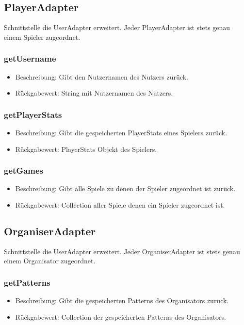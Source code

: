\documentclass[a4paper]{scrreprt}
\begin{document}
	\subsection{PlayerAdapter}
	Schnittstelle die UserAdapter erweitert.
	Jeder PlayerAdapter ist stets genau einem Spieler zugeordnet.

	\subsubsection{getUsername}
	\begin{itemize}
		\item Beschreibung: Gibt den Nutzernamen des Nutzers zurück.
		\item Rückgabewert: String mit Nutzernamen des Nutzers.
	\end{itemize}

	\subsubsection{getPlayerStats}
	\begin{itemize}
		\item Beschreibung: Gibt die gespeicherten PlayerStats eines Spielers zurück.
		\item Rückgabewert: PlayerStats Objekt des Spielers.
	\end{itemize}

	\subsubsection{getGames}
	\begin{itemize}
		\item Beschreibung: Gibt alle Spiele zu denen der Spieler zugeordnet ist zurück.
		\item Rückgabewert: Collection aller Spiele denen ein Spieler zugeordnet ist.
	\end{itemize}

	\subsection{OrganiserAdapter}
	Schnittstelle die UserAdapter erweitert.
	Jeder OrganiserAdapter ist stets genau einem Organisator zugeordnet.

	\subsubsection{getPatterns}
	\begin{itemize}
		\item Beschreibung: Gibt die gespeicherten Patterns des Organisators zurück.
		\item Rückgabewert: Collection der gespeicherten Patterns des Organisators.
	\end{itemize}
\end{document}
